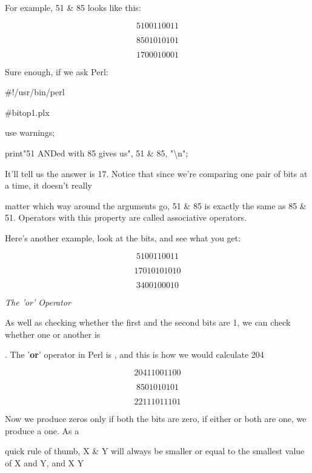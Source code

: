 \documentclass[a4paper,11pt]{book}
\begin{document}
\noindent 

\noindent For example, 51 \& 85 looks like this:

\noindent 

\[51 00110011\] 

\[85 01010101\] 

\[17 00010001\] 


\noindent Sure enough, if we ask Perl:

\noindent 

\noindent \#!/usr/bin/perl

\noindent \#bitop1.plx

\noindent use warnings;

\noindent print"51 ANDed with 85 gives us", 51 \& 85, "\textbackslash n";

\noindent 

\noindent 

\noindent It'll tell us the answer is 17. Notice that since we're comparing one pair of bits at a time, it doesn't really

\noindent matter which way around the arguments go, 51 \& 85 is exactly the same as 85 \& 51. Operators with this property are called associative operators.

\noindent 

\noindent Here's another example, look at the bits, and see what you get:

\noindent 

\[51 00110011\] 

\[170   10101010\] 

\[34 00100010\] 


\noindent \textit{The 'or' Operator}

\noindent As well as checking whether the first and the second bits are 1, we can check whether one or another is

. The '\textbf{or}' operator in Perl is \textbar , and this is how we would calculate 204 

\noindent 

\[204   11001100\] 

\[85     01010101\] 

\[221   11011101\] 


\noindent Now we produce zeros only if both the bits are zero, if either or both are one, we produce a one. As a

\noindent quick rule of thumb, X \& Y will always be smaller or equal to the smallest value of X and Y, and X \textbar  Y
\end{document}
